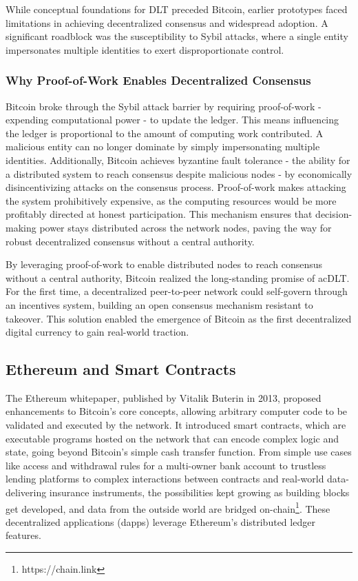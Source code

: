 \documentclass[11pt]{report}
\begin{document}
While conceptual foundations for \ac{DLT} preceded Bitcoin, earlier prototypes faced limitations in achieving decentralized consensus and widespread adoption. A significant roadblock was the susceptibility to Sybil attacks, where a single entity impersonates multiple identities to exert disproportionate control.

\subsubsection{Why Proof-of-Work Enables Decentralized Consensus}

Bitcoin broke through the Sybil attack barrier by requiring proof-of-work - expending computational power - to update the ledger. This means influencing the ledger is proportional to the amount of computing work contributed. A malicious entity can no longer dominate by simply impersonating multiple identities. Additionally, Bitcoin achieves byzantine fault tolerance - the ability for a distributed system to reach consensus despite malicious nodes - by economically disincentivizing attacks on the consensus process. Proof-of-work makes attacking the system prohibitively expensive, as the computing resources would be more profitably directed at honest participation. This mechanism ensures that decision-making power stays distributed across the network nodes, paving the way for robust decentralized consensus without a central authority.

By leveraging proof-of-work to enable distributed nodes to reach consensus without a central authority, Bitcoin realized the long-standing promise of ac{DLT}. For the first time, a decentralized peer-to-peer network could self-govern through an incentives system, building an open consensus mechanism resistant to takeover. This solution enabled the emergence of Bitcoin as the first decentralized digital currency to gain real-world traction.

\subsection{Ethereum and Smart Contracts}

The Ethereum whitepaper\cite{buterinEthereumNextgenerationSmart}, published by Vitalik Buterin in 2013, proposed enhancements to Bitcoin's core concepts, allowing arbitrary computer code to be validated and executed by the network. It introduced smart contracts, which are executable programs hosted on the network that can encode complex logic and state, going beyond Bitcoin's simple cash transfer function. From simple use cases like access and withdrawal rules for a multi-owner bank account to trustless lending platforms to complex interactions between contracts and real-world data-delivering insurance instruments, the possibilities kept growing as building blocks get developed, and data from the outside world are bridged on-chain\footnote{https://chain.link}. These decentralized applications (dapps) leverage Ethereum's distributed ledger features.
\end{document}
